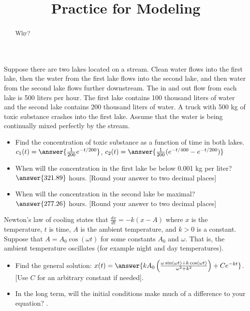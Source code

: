 \documentclass{ximera}
\title{Practice for Modeling}
\begin{document}
\begin{abstract}
    Why?
\end{abstract}
\maketitle

\begin{exercise}
    Suppose there are two lakes located on a stream.  Clean water flows into the first lake, then the water from the first lake flows into the second lake, and then water from the second lake flows further downstream. The in and out flow from each lake is 500 liters per hour. The first lake contains 100 thousand liters of water and the second lake contains 200 thousand liters of water. A truck with 500 kg of toxic substance crashes into the first lake.  Assume that the water is being continually mixed perfectly by the stream.
    \begin{itemize}
        \item Find the concentration of toxic substance as a function of time in both lakes. $c_1(t) = \answer{\frac{1}{200}e^{-t/200}}$, $c_2(t) = \answer{\frac{1}{200}(e^{-t/400} - e^{-t/200})}$
        \item When will the concentration in the first lake be below 0.001 kg per liter? $\answer{321.89}$ hours. [Round your answer to two decimal places]
        \item When will the concentration in the second lake be maximal? $\answer{277.26}$ hours. [Round your answer to two decimal places]
    \end{itemize}
\end{exercise}

\begin{exercise}
    Newton's law of cooling states that $\frac{dx}{dt} = -k(x-A)$ where $x$ is the temperature, $t$ is time, $A$ is the ambient temperature, and $k > 0$ is a constant. Suppose that $A = A_0 \cos (\omega t)$ for some constants $A_0$ and $\omega$. That is, the ambient temperature oscillates (for example night and day temperatures).
    \begin{itemize}
        \item Find the general solution: $x(t) = \answer{kA_0 \left(\frac{\omega \sin(\omega t) + k\cos(\omega t)}{\omega^2 + k^2}\right) + Ce^{-kt}}$. [Use $C$ for an arbitrary constant if needed].
        \item In the long term, will the initial conditions make much of a difference to your equation? .
    \end{itemize}
\end{exercise}
\end{document}
